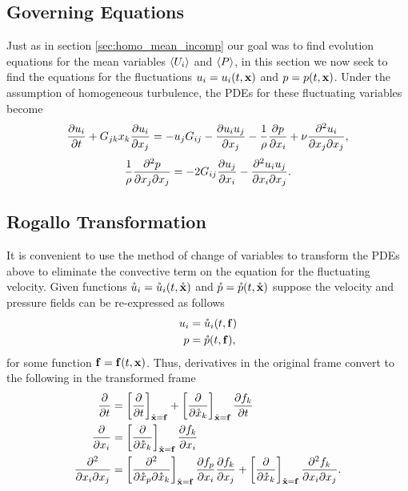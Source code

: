 \documentclass[oneside,a4paper,11pt]{report}
\begin{document}
\subsection{Governing Equations}
Just as in section \ref{sec:homo_mean_incomp} our goal was to find evolution equations for the mean variables $\langle U_i \rangle$ and $\langle P \rangle$, in this section we now seek to find the equations for the fluctuations $u_i = u_i(t,\mathbf{x})$ and $p= p(t,\mathbf{x})$. Under the assumption of homogeneous turbulence, the PDEs for these fluctuating variables become 
\begin{equation}
\label{fluc_u_homo}
\frac{\partial u_i}{\partial t} + G_{jk} x_k \frac{\partial u_i}{\partial x_j} = -u_j G_{ij} - \frac{\partial u_i u_j}{\partial x_j} - \frac{1}{\rho} \frac{\partial p}{\partial x_i} + \nu \frac{\partial^2 u_i}{\partial x_j \partial x_j},
\end{equation}
\begin{equation}
\label{fluc_p_homo}
\frac{1}{\rho} \frac{\partial^2 p}{\partial x_j \partial x_j} = -2 G_{ij} \frac{\partial u_j}{\partial x_i} - \frac{\partial^2 u_i u_j}{\partial x_i \partial x_j}.
\end{equation}

\subsection{Rogallo Transformation}
It is convenient to use the method of change of variables to transform the PDEs above to eliminate the convective term on the equation for the fluctuating velocity. Given functions $\mathring{u}_i = \mathring{u}_i(t,\mathring{\mathbf{x}})$ and $\mathring{p} = \mathring{p}(t,\mathring{\mathbf{x}})$ suppose the velocity and pressure fields can be re-expressed as follows
\begin{align}
u_i &= \mathring{u}_i(t,\mathbf{f}) \\
p &= \mathring{p}(t,\mathbf{f}),
\end{align}
for some function $\mathbf{f} = \bold{f}(t,\mathbf{x})$. Thus, derivatives in the original frame convert to the following in the transformed frame
\begin{align}
    \frac{\partial }{\partial t} &= \left [ \frac{\partial }{\partial t } \right ]_{\mathring{\mathbf{x}} = \bold{f}} + \left [ \frac{\partial }{\partial \mathring{x}_k}\right ]_{\mathring{\mathbf{x}} = \mathbf{f}} \frac{\partial f_k }{\partial t} \\
    \frac{\partial }{\partial x_i} &= \left [ \frac{\partial }{\partial \mathring{x}_k} \right ]_{\mathring{\mathbf{x}} = \mathbf{f}} \frac{\partial f_k}{\partial x_i} \\
    \frac{\partial^2 }{\partial x_i \partial x_j} &= \left [ \frac{\partial^2 }{\partial \mathring{x}_p \partial \mathring{x}_k} \right ]_{\mathring{\mathbf{x}} = \mathbf{f}} \frac{\partial f_p}{\partial x_i} \frac{\partial f_k}{\partial x_j} + \left [ \frac{\partial  }{\partial \mathring{x}_k} \right]_{\mathring{\mathbf{x}} = \mathbf{f} } \frac{\partial^2 f_k }{\partial x_i \partial x_j} .
\end{align}
\end{document}
